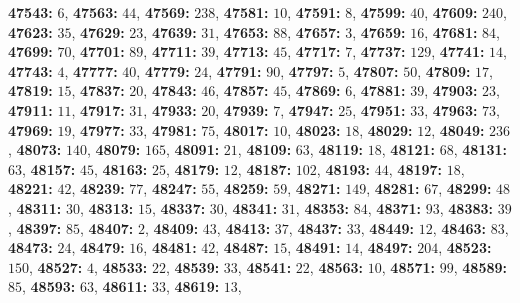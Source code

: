\textsf{\bfseries 47543:} $6$, \textsf{\bfseries 47563:} $44$, \textsf{\bfseries 47569:} $238$, \textsf{\bfseries 47581:} $10$, \textsf{\bfseries 47591:} $8$, \textsf{\bfseries 47599:} $40$, \textsf{\bfseries 47609:} $240$, \textsf{\bfseries 47623:} $35$, \textsf{\bfseries 47629:} $23$, \textsf{\bfseries 47639:} $31$, \textsf{\bfseries 47653:} $88$, \textsf{\bfseries 47657:} $3$, \textsf{\bfseries 47659:} $16$, \textsf{\bfseries 47681:} $84$, \textsf{\bfseries 47699:} $70$, \textsf{\bfseries 47701:} $89$, \textsf{\bfseries 47711:} $39$, \textsf{\bfseries 47713:} $45$, \textsf{\bfseries 47717:} $7$, \textsf{\bfseries 47737:} $129$, \textsf{\bfseries 47741:} $14$, \textsf{\bfseries 47743:} $4$, \textsf{\bfseries 47777:} $40$, \textsf{\bfseries 47779:} $24$, \textsf{\bfseries 47791:} $90$, \textsf{\bfseries 47797:} $5$, \textsf{\bfseries 47807:} $50$, \textsf{\bfseries 47809:} $17$, \textsf{\bfseries 47819:} $15$, \textsf{\bfseries 47837:} $20$, \textsf{\bfseries 47843:} $46$, \textsf{\bfseries 47857:} $45$, \textsf{\bfseries 47869:} $6$, \textsf{\bfseries 47881:} $39$, \textsf{\bfseries 47903:} $23$, \textsf{\bfseries 47911:} $11$, \textsf{\bfseries 47917:} $31$, \textsf{\bfseries 47933:} $20$, \textsf{\bfseries 47939:} $7$, \textsf{\bfseries 47947:} $25$, \textsf{\bfseries 47951:} $33$, \textsf{\bfseries 47963:} $73$, \textsf{\bfseries 47969:} $19$, \textsf{\bfseries 47977:} $33$, \textsf{\bfseries 47981:} $75$, \textsf{\bfseries 48017:} $10$, \textsf{\bfseries 48023:} $18$, \textsf{\bfseries 48029:} $12$, \textsf{\bfseries 48049:} $236$, \textsf{\bfseries 48073:} $140$, \textsf{\bfseries 48079:} $165$, \textsf{\bfseries 48091:} $21$, \textsf{\bfseries 48109:} $63$, \textsf{\bfseries 48119:} $18$, \textsf{\bfseries 48121:} $68$, \textsf{\bfseries 48131:} $63$, \textsf{\bfseries 48157:} $45$, \textsf{\bfseries 48163:} $25$, \textsf{\bfseries 48179:} $12$, \textsf{\bfseries 48187:} $102$, \textsf{\bfseries 48193:} $44$, \textsf{\bfseries 48197:} $18$, \textsf{\bfseries 48221:} $42$, \textsf{\bfseries 48239:} $77$, \textsf{\bfseries 48247:} $55$, \textsf{\bfseries 48259:} $59$, \textsf{\bfseries 48271:} $149$, \textsf{\bfseries 48281:} $67$, \textsf{\bfseries 48299:} $48$, \textsf{\bfseries 48311:} $30$, \textsf{\bfseries 48313:} $15$, \textsf{\bfseries 48337:} $30$, \textsf{\bfseries 48341:} $31$, \textsf{\bfseries 48353:} $84$, \textsf{\bfseries 48371:} $93$, \textsf{\bfseries 48383:} $39$, \textsf{\bfseries 48397:} $85$, \textsf{\bfseries 48407:} $2$, \textsf{\bfseries 48409:} $43$, \textsf{\bfseries 48413:} $37$, \textsf{\bfseries 48437:} $33$, \textsf{\bfseries 48449:} $12$, \textsf{\bfseries 48463:} $83$, \textsf{\bfseries 48473:} $24$, \textsf{\bfseries 48479:} $16$, \textsf{\bfseries 48481:} $42$, \textsf{\bfseries 48487:} $15$, \textsf{\bfseries 48491:} $14$, \textsf{\bfseries 48497:} $204$, \textsf{\bfseries 48523:} $150$, \textsf{\bfseries 48527:} $4$, \textsf{\bfseries 48533:} $22$, \textsf{\bfseries 48539:} $33$, \textsf{\bfseries 48541:} $22$, \textsf{\bfseries 48563:} $10$, \textsf{\bfseries 48571:} $99$, \textsf{\bfseries 48589:} $85$, \textsf{\bfseries 48593:} $63$, \textsf{\bfseries 48611:} $33$, \textsf{\bfseries 48619:} $13$, 
